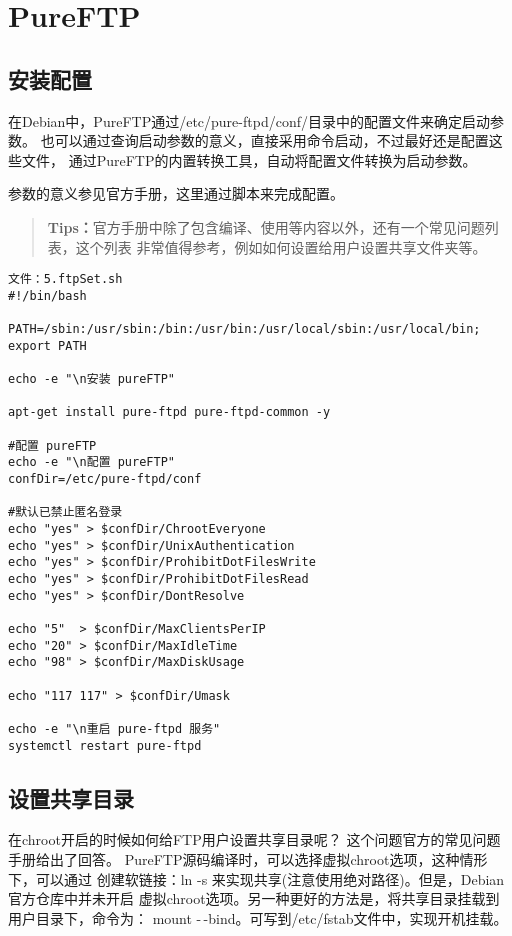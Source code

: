 ﻿\chapter{PureFTP}\label{chapter:FTP}

\section{安装配置}

在Debian中，PureFTP通过/etc/pure-ftpd/conf/目录中的配置文件来确定启动参数。%
也可以通过查询启动参数的意义，直接采用命令启动，不过最好还是配置这些文件，%
通过PureFTP的内置转换工具，自动将配置文件转换为启动参数。

参数的意义参见官方手册，这里通过脚本来完成配置。

\begin{quote}
\kaishu
\textbf{Tips：}官方手册中除了包含编译、使用等内容以外，还有一个常见问题列表，这个列表%
非常值得参考，例如如何设置给用户设置共享文件夹等。
\end{quote}

\begin{Verbatim}[]
文件：5.ftpSet.sh
#!/bin/bash

PATH=/sbin:/usr/sbin:/bin:/usr/bin:/usr/local/sbin:/usr/local/bin; export PATH

echo -e "\n安装 pureFTP"

apt-get install pure-ftpd pure-ftpd-common -y

#配置 pureFTP
echo -e "\n配置 pureFTP"
confDir=/etc/pure-ftpd/conf

#默认已禁止匿名登录
echo "yes" > $confDir/ChrootEveryone
echo "yes" > $confDir/UnixAuthentication
echo "yes" > $confDir/ProhibitDotFilesWrite
echo "yes" > $confDir/ProhibitDotFilesRead
echo "yes" > $confDir/DontResolve

echo "5"  > $confDir/MaxClientsPerIP
echo "20" > $confDir/MaxIdleTime
echo "98" > $confDir/MaxDiskUsage

echo "117 117" > $confDir/Umask

echo -e "\n重启 pure-ftpd 服务"
systemctl restart pure-ftpd
\end{Verbatim}

\section{设置共享目录}
在chroot开启的时候如何给FTP用户设置共享目录呢？%
这个问题官方的常见问题手册给出了回答。%
PureFTP源码编译时，可以选择虚拟chroot选项，这种情形下，可以通过%
创建软链接：ln -s 来实现共享(注意使用绝对路径)。但是，Debian官方仓库中并未开启%
虚拟chroot选项。另一种更好的方法是，将共享目录挂载到用户目录下，命令为：%
mount -\,-bind。可写到/etc/fstab文件中，实现开机挂载。

